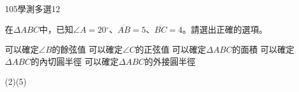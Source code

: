     \begin{QUESTION}
        \begin{ExamInfo}{105}{學測}{多選}{12}
        \end{ExamInfo}
        \begin{ExamAnsRateInfo}{30}{46}{27}{17}
        \end{ExamAnsRateInfo}
        \begin{QBODY}
            在$\Delta ABC$中，已知$\angle A=20{}^\circ $、$\overline{AB}=5$、$\overline{BC}=4$。請選出正確的選項。
			\begin{QOPS}
				\QOP 可以確定$\angle B$的餘弦值
				\QOP 可以確定$\angle C$的正弦值
				\QOP 可以確定$\Delta ABC$的面積
				\QOP 可以確定$\Delta ABC$的內切圓半徑
				\QOP 可以確定$\Delta ABC$的外接圓半徑
			\end{QOPS}
        \end{QBODY}
        \begin{QFROMS}
        \end{QFROMS}
        \begin{QTAGS}\end{QTAGS}
        \begin{QANS}
            (2)(5)
        \end{QANS}
        \begin{QSOLLIST}
        \end{QSOLLIST}
        \begin{QEMPTYSPACE}
        \end{QEMPTYSPACE}
    \end{QUESTION}

